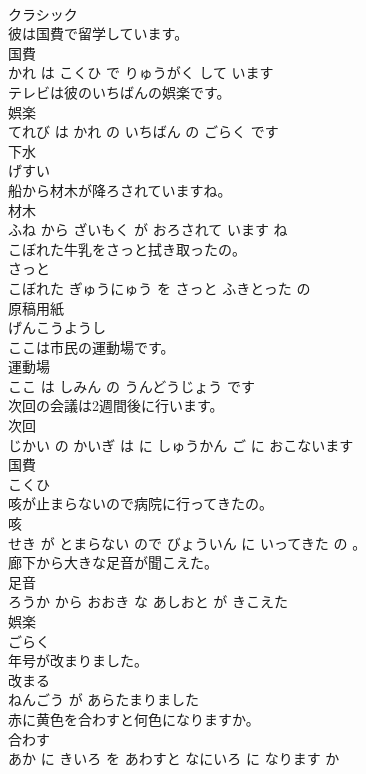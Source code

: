 \documentclass[8pt]{extreport}
\begin{document}
\begin{CJK}{UTF8}{min}
\\	クラシック	
\\	彼は国費で留学しています。	
\\	国費 
\\	かれ は こくひ で りゅうがく して います			
\\	テレビは彼のいちばんの娯楽です。	
\\	娯楽 
\\	てれび は かれ の いちばん の ごらく です			
\\	下水	
\\	げすい			
\\	船から材木が降ろされていますね。	
\\	材木 
\\	ふね から ざいもく が おろされて います ね			
\\	こぼれた牛乳をさっと拭き取ったの。	
\\	さっと 
\\	こぼれた ぎゅうにゅう を さっと ふきとった の			
\\	原稿用紙	
\\	げんこうようし			
\\	ここは市民の運動場です。	
\\	運動場 
\\	ここ は しみん の うんどうじょう です			
\\	次回の会議は2週間後に行います。	
\\	次回 
\\	じかい の かいぎ は に しゅうかん ご に おこないます			
\\	国費	
\\	こくひ			
\\	咳が止まらないので病院に行ってきたの。	
\\	咳 
\\	せき が とまらない ので びょういん に いってきた の 。			
\\	廊下から大きな足音が聞こえた。	
\\	足音 
\\	ろうか から おおき な あしおと が きこえた			
\\	娯楽	
\\	ごらく			
\\	年号が改まりました。	
\\	改まる 
\\	ねんごう が あらたまりました			
\\	赤に黄色を合わすと何色になりますか。	
\\	合わす 
\\	あか に きいろ を あわすと なにいろ に なります か			

\end{CJK}
\end{document}
